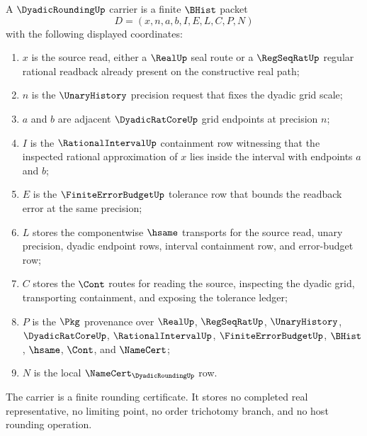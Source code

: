 \begin{definition}
\label{def:dyadic-rounding-carrier}
A $\DyadicRoundingUp$ carrier is a finite $\BHist$ packet
$$
D=(x,n,a,b,I,E,L,C,P,N)
$$
with the following displayed coordinates:
\begin{enumerate}
\item $x$ is the source read, either a $\RealUp$ seal route or a $\RegSeqRatUp$ regular rational readback already present on the constructive real path;
\item $n$ is the $\UnaryHistory$ precision request that fixes the dyadic grid scale;
\item $a$ and $b$ are adjacent $\DyadicRatCoreUp$ grid endpoints at precision $n$;
\item $I$ is the $\RationalIntervalUp$ containment row witnessing that the inspected rational approximation of $x$ lies inside the interval with endpoints $a$ and $b$;
\item $E$ is the $\FiniteErrorBudgetUp$ tolerance row that bounds the readback error at the same precision;
\item $L$ stores the componentwise $\hsame$ transports for the source read, unary precision, dyadic endpoint rows, interval containment row, and error-budget row;
\item $C$ stores the $\Cont$ routes for reading the source, inspecting the dyadic grid, transporting containment, and exposing the tolerance ledger;
\item $P$ is the $\Pkg$ provenance over $\RealUp$, $\RegSeqRatUp$, $\UnaryHistory$, $\DyadicRatCoreUp$, $\RationalIntervalUp$, $\FiniteErrorBudgetUp$, $\BHist$, $\hsame$, $\Cont$, and $\NameCert$;
\item $N$ is the local $\NameCert_{\DyadicRoundingUp}$ row.
\end{enumerate}
The carrier is a finite rounding certificate. It stores no completed real representative, no limiting point, no order trichotomy branch, and no host rounding operation.
\end{definition}

